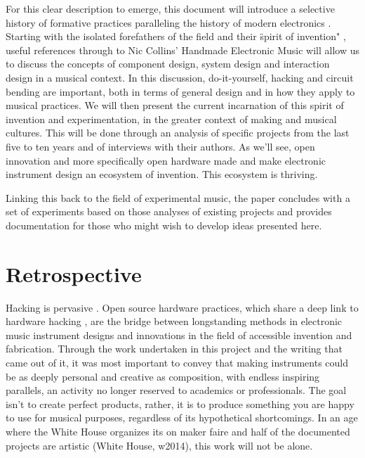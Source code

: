 	For this clear description to emerge, this document will introduce a selective history of formative practices paralleling the history of modern electronics \cite{holmes2002}. Starting with the isolated forefathers of the field and their \"spirit of invention" \cite{dunn2001}, useful references through to Nic Collins' Handmade Electronic Music \cite{collins2006} will allow us to discuss the concepts of component design, system design and interaction design in a musical context. In this discussion, do-it-yourself, hacking and circuit bending are important, both in terms of general design and in how they apply to musical practices. We will then present the current incarnation of this spirit of invention and experimentation, in the greater context of making and musical cultures. This will be done through an analysis of specific projects from the last five to ten years and of interviews with their authors. As we'll see, open innovation \cite{christensen2005} and more specifically open hardware made and make electronic instrument design an ecosystem of invention. This ecosystem is thriving. 

	Linking this back to the field of experimental music, the paper concludes with a set of experiments based on those analyses of existing projects and provides documentation for those who might wish to develop ideas presented here.

\section{Retrospective}

Hacking is pervasive \cite{paradiso2008}. Open source hardware practices, which share a deep link to hardware hacking \cite{williams2012}, are the bridge between longstanding methods in electronic music instrument designs and innovations in the field of accessible invention and fabrication. Through the work undertaken in this project and the writing that came out of it, it was most important to convey that making instruments could be as deeply personal and creative as composition, with endless inspiring parallels, an activity no longer reserved to academics or professionals. The goal isn't to create perfect products, rather, it is to produce something you are happy to use for musical purposes, regardless of its hypothetical shortcomings. In an age where the White House organizes its on maker faire and half of the documented projects are artistic (White House, w2014), this work will not be alone.
	

